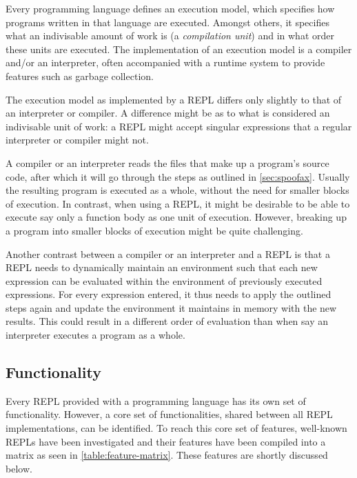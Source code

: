 Every programming language defines an execution model, which specifies how
programs written in that language are executed. Amongst others, it specifies
what an indivisable amount of work is (a \emph{compilation unit}) and in what
order these units are executed. The implementation of an execution model is a
compiler and/or an interpreter, often accompanied with a runtime system to
provide features such as garbage collection.

The execution model as implemented by a REPL differs only slightly to that of an
interpreter or compiler. A difference might be as to what is considered an
indivisable unit of work: a REPL might accept singular expressions that a
regular interpreter or compiler might not. 

A compiler or an interpreter reads the files that make up a program’s source
code, after which it will go through the steps as outlined in
\cref{sec:spoofax}. Usually the resulting program is executed as a whole,
without the need for smaller blocks of execution. In contrast, when using a
REPL, it might be desirable to be able to execute say only a function body as
one unit of execution. However, breaking up a program into smaller blocks of
execution might be quite challenging.

Another contrast between a compiler or an interpreter and a REPL is that a REPL
needs to dynamically maintain an environment such that each new expression can
be evaluated within the environment of previously executed expressions. For
every expression entered, it thus needs to apply the outlined steps again and
update the environment it maintains in memory with the new results. This could
result in a different order of evaluation than when say an interpreter executes
a program as a whole.

\subsection{Functionality}
\label{ssec:repl-functionality}

Every REPL provided with a programming language has its own set of
functionality. However, a core set of functionalities, shared between all REPL
implementations, can be identified. To reach this core set of features,
well-known REPLs have been investigated and their features have been compiled
into a matrix as seen in \cref{table:feature-matrix}. These features are shortly
discussed below.

